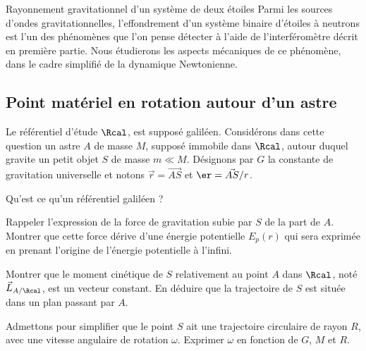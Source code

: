 \begin{exo}[PC][1][devoir]{Rayonnement gravitationnel d'un système de deux étoiles}
    Parmi les sources d'ondes gravitationnelles, l'effondrement d'un système binaire d'étoiles à neutrons
    est l'un des phénomènes que l'on pense détecter à l'aide de l'interféromètre décrit en première partie.
    Nous étudierons les aspects mécaniques de ce phénomène, dans le cadre simplifié de la dynamique
    Newtonienne.
    \subsection{Point matériel en rotation autour d'un astre}
    Le référentiel d'étude $\Rcal$, est supposé galiléen. Considérons dans cette question un astre $A$ de masse $M$, supposé immobile dans $\Rcal$, autour duquel
    gravite un petit objet $S$ de masse $m \ll M$. Désignons par $G$ la constante de gravitation universelle et
    notons $\Vec{r} = \Vec{AS}$ et $\er = \Vec{AS}/r$.
    \begin{quest}
    \item Qu'est ce qu'un référentiel galiléen ?

    \item Rappeler l'expression de la force de gravitation subie par $S$ de la part de $A$. Montrer que cette
    force dérive d'une énergie potentielle $E_p(r)$ qui sera exprimée en prenant l'origine de l'énergie
    potentielle à l'infini.


    \item Montrer que le moment cinétique de $S$ relativement au point $A$ dans $\Rcal$, noté $\Vec{L}_{A/\Rcal}$, est un
    vecteur constant. En déduire que la trajectoire de $S$ est située dans un plan passant par $A$.

    \item Admettons pour simplifier que le point $S$ ait une trajectoire circulaire de rayon $R$, avec
    une vitesse angulaire de rotation $\omega$. Exprimer $\omega$
    en fonction de $G$, $M$ et $R$.


\end{quest}
\end{exo}
